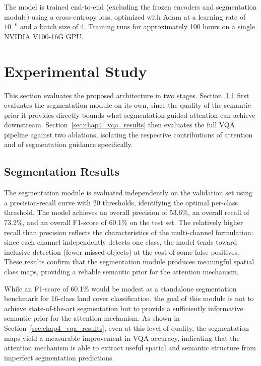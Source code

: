 The model is trained end-to-end (excluding the frozen
encoders and segmentation module) using a cross-entropy
loss, optimized with Adam at a learning rate of $10^{-6}$
and a batch size of 4. Training runs for approximately
100 hours on a single NVIDIA V100-16G GPU.

\section{Experimental Study}
\label{sec:chap4_experiments}
This section evaluates the proposed architecture in two stages. 
Section~\ref{sec:chap4_seg_results} first evaluates the segmentation module on its own,
 since the quality of the semantic prior it provides directly bounds what segmentation-guided attention can achieve downstream. 
 Section~\ref{sec:chap4_vqa_results} then evaluates the full VQA pipeline against two ablations, 
isolating the respective contributions of attention and of segmentation guidance specifically.
\subsection{Segmentation Results}
\label{sec:chap4_seg_results}

The segmentation module is evaluated independently on the
validation set using a precision-recall curve with 20
thresholds, identifying the optimal per-class threshold.
The model achieves an overall precision of 53.6\%, an
overall recall of 73.2\%, and an overall F1-score of
60.1\% on the test set. The relatively higher recall than precision
reflects the characteristics of the multi-channel
formulation: since each channel independently detects
one class, the model tends toward inclusive detection
(fewer missed objects) at the cost of some false
positives. These results confirm that the segmentation
module produces meaningful spatial class maps, providing
a reliable semantic prior for the attention mechanism.

While an F1-score of 60.1\% would be modest as a
standalone segmentation benchmark for 16-class land cover
classification, the goal of this module is not to achieve
state-of-the-art segmentation but to provide a sufficiently
informative semantic prior for the attention mechanism.
As shown in Section~\ref{sec:chap4_vqa_results}, even at
this level of quality, the segmentation maps yield a
measurable improvement in VQA accuracy, indicating that
the attention mechanism is able to extract useful spatial
and semantic structure from imperfect segmentation
predictions.

